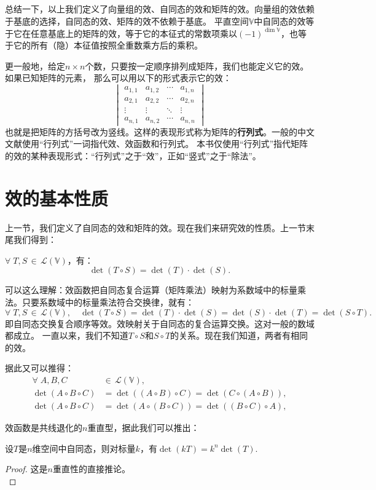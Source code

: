 \documentclass[12pt,UTF8,fontset=none]{ctexbook}
\begin{document}
总结一下，以上我们定义了向量组的效、自同态的效和矩阵的效。向量组的效依赖于基底的选择，自同态的效、矩阵的效不依赖于基底。
平直空间$\mathbb{V}$中自同态的效等于它在任意基底上的矩阵的效，等于它的本征式的常数项乘以$(-1)^{\dim \mathbb{V}}$，也等于它的所有（隐）本征值按照全重数乘方后的乘积。

更一般地，给定$n\times n$个数，只要按一定顺序排列成矩阵，我们也能定义它的效。如果已知矩阵的元素，
那么可以用以下的形式表示它的效：
$$ \begin{vmatrix}
    a_{1,1} & a_{1,2}  & \cdots & a_{1,n} \\
    a_{2,1} & a_{2,2} &  \cdots & a_{2,n} \\
    \vdots & \vdots & \ddots & \vdots \\
    a_{n,1} & a_{n,2} & \cdots & a_{n,n} 
\end{vmatrix}$$
也就是把矩阵的方括号改为竖线。这样的表现形式称为矩阵的\textbf{行列式}。一般的中文文献使用“行列式”一词指代效、效函数和行列式。
本书仅使用“行列式”指代矩阵的效的某种表现形式：“行列式”之于“效”，正如“竖式”之于“除法”。

\section{效的基本性质}
上一节，我们定义了自同态的效和矩阵的效。现在我们来研究效的性质。上一节末尾我们得到：
\begin{pp}
    $\forall \;T,S\,\in\,\mathcal{L}(\mathbb{V})$，有：
    $$ \det (T\circ S) = \det(T) \cdot \det(S). $$
\end{pp}
可以这么理解：效函数把自同态复合运算（矩阵乘法）映射为系数域中的标量乘法。只要系数域中的标量乘法符合交换律，就有：
$$
\forall \;T,S\,\in\,\mathcal{L}(\mathbb{V}), \quad \det (T\circ S) = \det(T) \cdot \det(S) = \det(S) \cdot \det(T) = \det(S\circ T).
$$
即自同态交换复合顺序等效。效映射关于自同态的复合运算交换。这对一般的数域都成立。
一直以来，我们不知道$T\circ S$和$S\circ T$的关系。现在我们知道，两者有相同的效。

据此又可以推得：
\begin{align*}
\forall \;A,B,C\,&\in\,\mathcal{L}(\mathbb{V}), \\
 \det (A\circ B\circ C) &= \det ((A\circ B)\circ C) = \det(C\circ(A\circ B)), \\
 \det (A\circ B\circ C) &= \det (A\circ (B\circ C)) = \det((B\circ C)\circ A),
\end{align*}

效函数是共线退化的$n$重直型，据此我们可以推出：
\begin{pp}\label{pp:10_30}
    设$T$是$n$维空间中自同态，则对标量$k$，有$\det(kT) = k^n \det(T)$.
\end{pp}
\begin{proof} %
    这是$n$重直性的直接推论。\\
\end{proof}
\end{document}
